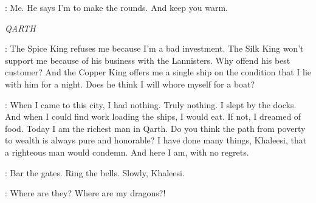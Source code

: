 \OSHA: Me. He says I'm to make the rounds. And keep you warm. 



\scene

\textit{QARTH} 


\DAENERYS: The Spice King refuses me because I'm a bad investment. The Silk King won't support me because of his business with the Lannisters. Why offend his best customer? And the Copper King offers me a single ship on the condition that I lie with him for a night. Does he think I will whore myself for a boat? 

\XARO: When I came to this city, I had nothing. Truly nothing. I slept by the docks. And when I could find work loading the ships, I would eat. If not, I dreamed of food. Today I am the richest man in Qarth. Do you think the path from poverty to wealth is always pure and honorable? I have done many things, Khaleesi, that a righteous man would condemn. And here I am, with no regrets. 


\XARO: Bar the gates. Ring the bells. Slowly, Khaleesi. 

\DAENERYS: Where are they? Where are my dragons?! 


